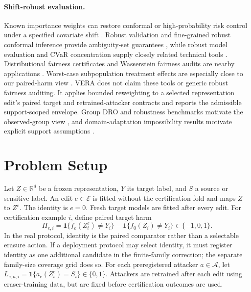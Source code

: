 \paragraph{Shift-robust evaluation.}
Known importance weights can restore conformal or high-probability risk control
under a specified covariate shift
\cite{tibshirani2019covariate,almeida2025hprc}. Robust validation and
fine-grained robust conformal inference provide ambiguity-set guarantees
\cite{cauchois2024robust,ai2024finegrained}, while robust model evaluation and
CVaR concentration supply closely related technical tools
\cite{najafi2025federated,thomas2019cvar,waudbysmith2024means}. Distributional
fairness certificates and Wasserstein fairness audits are nearby applications
\cite{kang2022certifying,ehyaei2025fragile}. Worst-case subpopulation
treatment effects are especially close to our paired-harm view
\cite{jeong2020worstcase}. VERA does not claim these tools or generic robust
fairness auditing. It applies bounded reweighting to a selected representation
edit's paired target and retrained-attacker contracts and reports the admissible
support-scoped envelope. Group DRO and robustness benchmarks motivate the observed-group view
\cite{sagawa2020groupdro,koh2021wilds,sohoni2020subclass}, and
domain-adaptation impossibility results motivate explicit support assumptions
\cite{bendavid2010impossibility,subbaswamy2021evaluation}.

\section{Problem Setup}

Let $Z\in\mathbb{R}^d$ be a frozen representation, $Y$ its target label, and
$S$ a source or sensitive label. An edit $e\in\mathcal E$ is fitted without the
certification fold and maps $Z$ to $Z^e$. The identity is $e=0$. Fresh target
models are fitted after every edit. For certification example $i$, define
paired target harm
\begin{equation}
H_{e,i}=\mathbf 1\{f_e(Z_i^e)\ne Y_i\}-
\mathbf 1\{f_0(Z_i)\ne Y_i\}\in\{-1,0,1\}.
\end{equation}
In the real protocol, identity is the paired comparator rather than a selectable
erasure action. If a deployment protocol may select identity, it must register
identity as one additional candidate in the finite-family correction; the
separate family-size coverage grid does so.
For each preregistered attacker $a\in\mathcal A$, let
$L_{e,a,i}=\mathbf 1\{a_e(Z_i^e)=S_i\}\in\{0,1\}$. Attackers are retrained
after each edit using eraser-training data, but are fixed before certification
outcomes are used.

